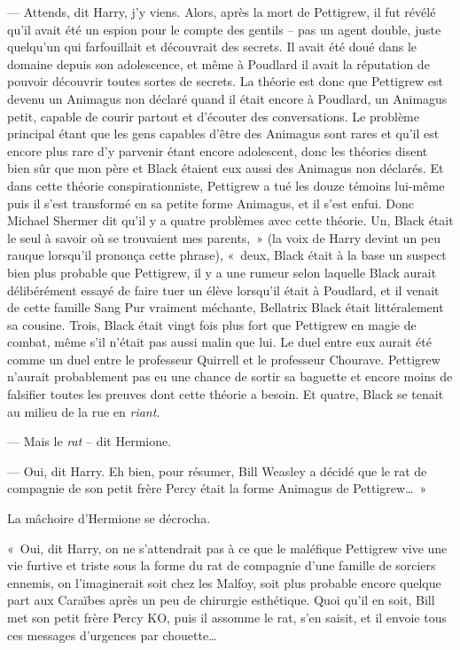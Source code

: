 --- Attends, dit Harry, j'y viens. Alors, après la mort de Pettigrew, il fut révélé qu'il avait été un espion pour le compte des gentils -- pas un agent double, juste quelqu'un qui farfouillait et découvrait des secrets. Il avait été doué dans le domaine depuis son adolescence, et même à Poudlard il avait la réputation de pouvoir découvrir toutes sortes de secrets. La théorie est donc que Pettigrew est devenu un Animagus non déclaré quand il était encore à Poudlard, un Animagus petit, capable de courir partout et d'écouter des conversations. Le problème principal étant que les gens capables d'être des Animagus sont rares et qu'il est encore plus rare d'y parvenir étant encore adolescent, donc les théories disent bien sûr que mon père et Black étaient eux aussi des Animagus non déclarés. Et dans cette théorie conspirationniste, Pettigrew a tué les douze témoins lui-même puis il s'est transformé en sa petite forme Animagus, et il s'est enfui. Donc Michael Shermer dit qu'il y a quatre problèmes avec cette théorie. Un, Black était le seul à savoir où se trouvaient mes parents,~» (la voix de Harry devint un peu rauque lorsqu'il prononça cette phrase), «~deux, Black était à la base un suspect bien plus probable que Pettigrew, il y a une rumeur selon laquelle Black aurait délibérément essayé de faire tuer un élève lorsqu'il était à Poudlard, et il venait de cette famille Sang Pur vraiment méchante, Bellatrix Black était littéralement sa cousine. Trois, Black était vingt fois plus fort que Pettigrew en magie de combat, même s'il n'était pas aussi malin que lui. Le duel entre eux aurait été comme un duel entre le professeur Quirrell et le professeur Chourave. Pettigrew n'aurait probablement pas eu une chance de sortir sa baguette et encore moins de falsifier toutes les preuves dont cette théorie a besoin. Et quatre, Black se tenait au milieu de la rue en \emph{riant}.

--- Mais le \emph{rat} -- dit Hermione.

--- Oui, dit Harry. Eh bien, pour résumer, Bill Weasley a décidé que le rat de compagnie de son petit frère Percy était la forme Animagus de Pettigrew…~»

La mâchoire d'Hermione se décrocha.

«~Oui, dit Harry, on ne s'attendrait pas à ce que le maléfique Pettigrew vive une vie furtive et triste sous la forme du rat de compagnie d'une famille de sorciers ennemis, on l'imaginerait soit chez les Malfoy, soit plus probable encore quelque part aux Caraïbes après un peu de chirurgie esthétique. Quoi qu'il en soit, Bill met son petit frère Percy KO, puis il assomme le rat, s'en saisit, et il envoie tous ces messages d'urgences par chouette…

